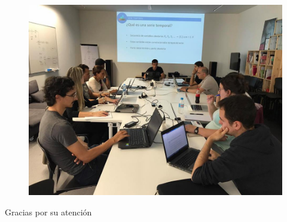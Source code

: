 \documentclass[10pt,a4paper,twoside]{beamer}
\begin{document}
\begin{frame}

\begin{figure}
    \centering
    \centerline{\includegraphics[scale = 0.3]{Images/taller-2.jpg}}
\end{figure}

\end{frame}


\begin{frame}

\begin{center}
\Huge{Gracias por su atención}
\end{center}

\end{frame}
\end{document}
